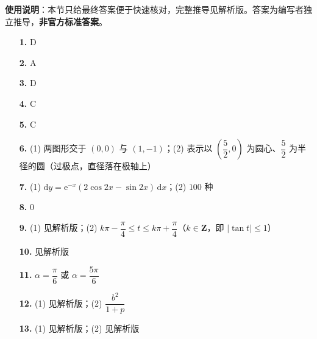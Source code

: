 
\begin{gknotice}
\textbf{使用说明}：本节只给最终答案便于快速核对，完整推导见解析版。答案为编写者独立推导，\textbf{非官方标准答案}。
\end{gknotice}

\begin{itemize}[leftmargin=2.6em]
  \item[\textbf{1.}] D
  \item[\textbf{2.}] A
  \item[\textbf{3.}] D
  \item[\textbf{4.}] C
  \item[\textbf{5.}] C
  \item[\textbf{6.}] (1) 两图形交于 $(0,0)$ 与 $(1,-1)$；(2) 表示以 $\left(\dfrac52,0\right)$ 为圆心、$\dfrac52$ 为半径的圆（过极点，直径落在极轴上）
  \item[\textbf{7.}] (1) $\mathrm dy=\mathrm e^{-x}(2\cos 2x-\sin 2x)\,\mathrm dx$；(2) $100$ 种
  \item[\textbf{8.}] $0$
  \item[\textbf{9.}] (1) 见解析版；(2) $k\pi-\dfrac{\pi}{4}\leqslant t\leqslant k\pi+\dfrac{\pi}{4}$（$k\in\mathbf{Z}$，即 $\lvert\tan t\rvert\leqslant1$）
  \item[\textbf{10.}] 见解析版
  \item[\textbf{11.}] $\alpha=\dfrac{\pi}{6}$ 或 $\alpha=\dfrac{5\pi}{6}$
  \item[\textbf{12.}] (1) 见解析版；(2) $\dfrac{b^2}{1+p}$
  \item[\textbf{13.}] (1) 见解析版；(2) 见解析版
\end{itemize}
